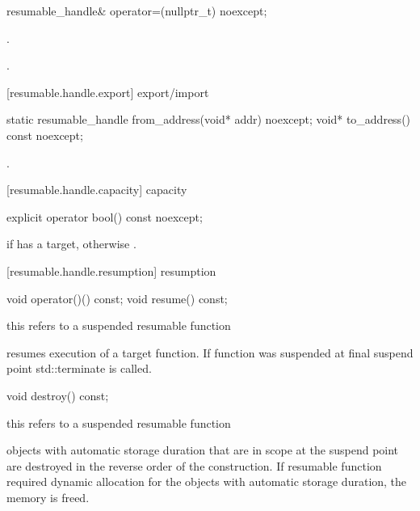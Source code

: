 \begin{itemdecl}
  resumable_handle& operator=(nullptr_t) noexcept;
\end{itemdecl}
\begin{itemdescr}
	\pnum\postconditions {}.
  
  \pnum\returns {}.
\end{itemdescr}

[resumable.handle.export]{ export/import}
\begin{itemdecl}
  static resumable_handle from_address(void* addr) noexcept;		
  void* to_address() const noexcept;
\end{itemdecl}

\begin{itemdescr}
  \pnum
  \postconditions {}.
\end{itemdescr}

[resumable.handle.capacity]{ capacity}
\begin{itemdecl}
  explicit operator bool() const noexcept;
\end{itemdecl}

\begin{itemdescr}
  \pnum
  \returns {} if  has a target, otherwise .
\end{itemdescr}

[resumable.handle.resumption]{ resumption}
\begin{itemdecl}
  void operator()() const;
  void resume() const;	
\end{itemdecl}
\begin{itemdescr}
  \pnum
  \precondition *this refers to a suspended resumable function
  
  \pnum
  \effects resumes execution of a target function. If function was suspended
  at final suspend point std::terminate is called.
\end{itemdescr}

\begin{itemdecl}
  void destroy() const;
\end{itemdecl}
\begin{itemdescr}
  \pnum
  \precondition *this refers to a suspended resumable function
  
  \pnum
  \effects objects with automatic storage duration that are in scope
  at the suspend point are destroyed in the reverse order of the construction. If resumable function required dynamic allocation
  for the objects with automatic storage duration, the memory
  is freed.
\end{itemdescr}

